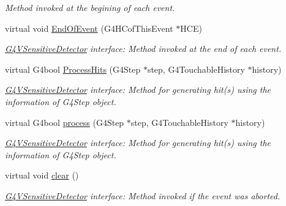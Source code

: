 \begin{DoxyCompactItemize}
\begin{DoxyCompactList}\small\item\em Method invoked at the begining of each event. \item\end{DoxyCompactList}\item 
virtual void \hyperlink{class_d_d4hep_1_1_simulation_1_1_geant4_sensitive_detector_a1275a33abdbd4efb70ee1698eda3d2db}{EndOfEvent} (G4HCofThisEvent $\ast$HCE)
\begin{DoxyCompactList}\small\item\em \hyperlink{class_g4_v_sensitive_detector}{G4VSensitiveDetector} interface: Method invoked at the end of each event. \item\end{DoxyCompactList}\item 
virtual G4bool \hyperlink{class_d_d4hep_1_1_simulation_1_1_geant4_sensitive_detector_ac889694c4406ea089f3172b73da49134}{ProcessHits} (G4Step $\ast$step, G4TouchableHistory $\ast$history)
\begin{DoxyCompactList}\small\item\em \hyperlink{class_g4_v_sensitive_detector}{G4VSensitiveDetector} interface: Method for generating hit(s) using the information of G4Step object. \item\end{DoxyCompactList}\item 
virtual G4bool \hyperlink{class_d_d4hep_1_1_simulation_1_1_geant4_sensitive_detector_aea5cd9b90bf1102dcf9e027f618cabe6}{process} (G4Step $\ast$step, G4TouchableHistory $\ast$history)
\begin{DoxyCompactList}\small\item\em \hyperlink{class_g4_v_sensitive_detector}{G4VSensitiveDetector} interface: Method for generating hit(s) using the information of G4Step object. \item\end{DoxyCompactList}\item 
virtual void \hyperlink{class_d_d4hep_1_1_simulation_1_1_geant4_sensitive_detector_a594a8e0083028c98326f99ace2f0f8dd}{clear} ()
\begin{DoxyCompactList}\small\item\em \hyperlink{class_g4_v_sensitive_detector}{G4VSensitiveDetector} interface: Method invoked if the event was aborted. \item\end{DoxyCompactList}\end{DoxyCompactItemize}
